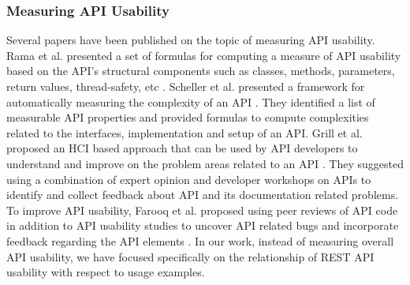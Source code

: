 \documentclass[conference]{IEEEtran}
\begin{document}
\subsubsection{Measuring API Usability}
Several papers have been published on the topic of measuring API usability. Rama et al. presented a set of formulas for computing a measure of API usability based on the API's structural components such as classes, methods, parameters, return values, thread-safety, etc \cite{rama}. Scheller et al. presented a framework for automatically measuring the complexity of an API \cite{scheller2015automated}. They identified a list of measurable API properties and provided formulas to compute complexities related to the interfaces, implementation and setup of an API. Grill et al. proposed an HCI based approach that can be used by API developers to understand and improve on the problem areas related to an API \cite{Grill2012}. They suggested using a combination of expert opinion and developer workshops on APIs to identify and collect feedback about API and its documentation related problems. To improve API usability, Farooq et al. proposed using peer reviews of API code in addition to API usability studies to uncover API related bugs and incorporate feedback regarding the API elements \cite{Farooq:2010:AUP:1753326.1753677}. In our work, instead of measuring overall API usability, we have focused specifically on the relationship of REST API usability with respect to usage examples.
\end{document}
